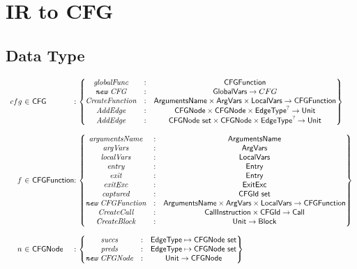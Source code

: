 \chapter{IR to CFG}

\section{Data Type}
\[
\begin{array}{r@{~}l@{~}l@{}l@{~}l}
cfg & \in & \SF{CFG} & : &
\begin{Bmatrix}
\emph{globalFunc} & : & \SF{CFGFunction} \\
\emph{\TT{new}\ CFG} & : & \SF{GlobalVars} \rightarrow CFG\\
\emph{CreateFunction} & : & \SF{ArgumentsName} \times \SF{ArgVars} \times \SF{LocalVars} \rightarrow \SF{CFGFunction} \\
\emph{AddEdge} & : & \SF{CFGNode} \times \SF{CFGNode} \times \SF{EdgeType}^? \rightarrow \SF{Unit} \\
\emph{AddEdge} & : & \SF{CFGNode set} \times \SF{CFGNode} \times \SF{EdgeType}^? \rightarrow \SF{Unit} \\
\end{Bmatrix}\\
&&\\

f & \in & \SF{CFGFunction} & : &
\begin{Bmatrix}
\emph{argumentsName} & : & \SF{ArgumentsName} \\
\emph{argVars} & : & \SF{ArgVars} \\
\emph{localVars} & : & \SF{LocalVars} \\
\emph{entry} & : & \SF{Entry} \\
\emph{exit} & : & \SF{Entry} \\
\emph{exitExc} & : & \SF{ExitExc} \\
\emph{captured} & : & \SF{CFGId set} \\
\emph{\TT{new}\ CFGFunction} & : & \SF{ArgumentsName} \times \SF{ArgVars} \times \SF{LocalVars} \rightarrow \SF{CFGFunction} \\
\emph{CreateCall} & : & \SF{CallInstruction} \times \SF{CFGId}  \rightarrow \SF{Call} \\
\emph{CreateBlock} & : & \SF{Unit} \rightarrow \SF{Block} \\
\end{Bmatrix}\\
&&\\

n & \in & \SF{CFGNode} & : &
\begin{Bmatrix}
\emph{succs} & : & \SF{EdgeType} \mapsto \SF{CFGNode set}\\
\emph{preds} & : & \SF{EdgeType} \mapsto \SF{CFGNode set}\\
\emph{\TT{new}\ CFGNode} & : & \SF{Unit}  \rightarrow \SF{CFGNode} \\
\end{Bmatrix}\\


\end{array}\]

